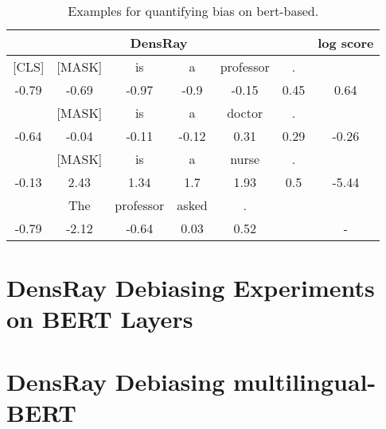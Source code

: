 \documentclass[11pt,a4paper]{article}
\def\tablabel#1{\label{tab:#1}\label{p:#1}}
\begin{document}

\begin{table}[ht]
	\centering
	\scriptsize
	\begin{tabular}{ccccccc}
		\hline
\multicolumn{6}{c|}{DensRay}&log score\\		
\hline
[CLS] &[MASK] &is &a& professor &.&\\
-0.79 &-0.69 &-0.97 &-0.9  &-0.15  &0.45&0.64\\
\hline
[CLS] &[MASK] &is &a& doctor &.&\\
-0.64 &-0.04 &-0.11 &-0.12  &0.31  &0.29 &-0.26\\
\hline
[CLS] &[MASK] &is &a& nurse &.&\\
-0.13  &2.43  &1.34  &1.7   &1.93  &0.5 &-5.44\\
\hline
[CLS] &The &professor &asked &.&&\\
-0.79 &-2.12 &-0.64 & 0.03&  0.52&&-\\

		\hline
	\end{tabular}
	\caption{\tablabel{t:measure1}
		Examples for quantifying bias on bert-based.}
\end{table}

\section{DensRay Debiasing Experiments on BERT Layers}


\section{DensRay Debiasing multilingual-BERT}

\end{document}
